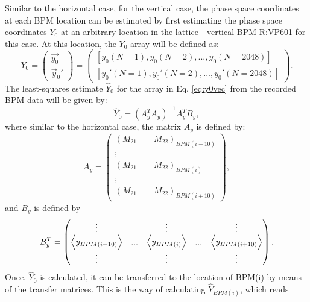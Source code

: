 Similar to the horizontal case, for the vertical case, the phase space coordinates at each BPM location can be estimated by first estimating the phase space coordinates $Y_0$ at an arbitrary location in the lattice---vertical BPM R:VP601 for this case. At this location, the $Y_0$ array will be defined as:
\begin{equation}
    \label{eq:y0vec}
    Y_0= 
    \begin{pmatrix}
        \vec{y_0} \\
        \vec{y}_0'
    \end{pmatrix} = 
    \begin{pmatrix}
        \left[ y_0(N=1), y_0(N=2), ...,y_0(N=2048) \right] \\
        \left[ y_0'(N=1), y_0'(N=2), ..., y_0'(N=2048) \right]
    \end{pmatrix}.
\end{equation} 
The least-squares estimate $\hat{Y}_0$ for the array in Eq. \ref{eq:y0vec} from the recorded BPM data will be given by:
\begin{equation}
    \label{eq:y0hat}
    \hat{Y}_0 = (A_y^T A_y)^{-1} A_y^T B_y,
\end{equation}
where similar to the horizontal case, the matrix $A_y$ is defined by:
\begin{equation}
    \label{eq:alsqy}
        A_y =
        \begin{pmatrix}
        \left( M_{21} \qquad M_{22} \right)_{BPM(i-10)} \\
        \vdots \\
        \left( M_{21} \qquad M_{22} \right)_{BPM(i)}  \\
        \vdots \\
        \left( M_{21} \qquad M_{22} \right)_{BPM(i+10)} 
        \end{pmatrix},
\end{equation}
and $B_y$ is defined by
\begin{equation}
    \label{eq:balsqy}
    B_y^T =
    \begin{pmatrix}
    \vdots & & \vdots & & \vdots \\
    \Bigl< y_{BPM(i-10)} \Bigr> & ... &  \Bigl< y_{BPM(i)} \Bigr> &  ... & \Bigl< y_{BPM(i+10)} \Bigr> \\
    \vdots & & \vdots & & \vdots \\
    \end{pmatrix}. 
\end{equation}
Once, $\hat{Y}_0$ is calculated, it can be transferred to the location of BPM(i) by means of the transfer matrices. This is the way of calculating $\hat{Y}_{BPM(i)}$, which reads

